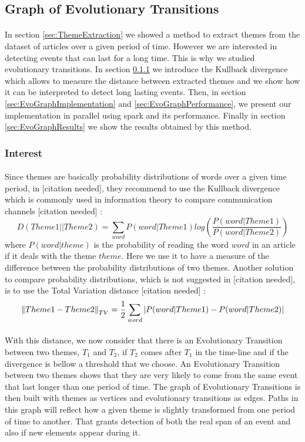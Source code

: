 \subsection{Graph of Evolutionary Transitions}
\paragraph{}
In section \ref{sec:ThemeExtraction} we showed a method to extract themes from the dataset of articles over a given period of time. However we are interested in detecting events that can last for a long time. This is why we studied evolutionary transitions. In section \ref{sec:EvoGraphInterest} we introduce the Kullback divergence which allows to measure the distance between extracted themes and we show how it can be interpreted to detect long lasting events. Then, in section \ref{sec:EvoGraphImplementation} and \ref{sec:EvoGraphPerformance}, we present our implementation in parallel using spark and its performance. Finally in section \ref{sec:EvoGraphResults} we show the results obtained by this method.

\subsubsection{Interest}
\label{sec:EvoGraphInterest}

\paragraph{}
Since themes are basically probability distributions of words over a given time period, in [citation needed], they recommend to use the Kullback divergence which is commonly used in information theory to compare communication channels [citation needed] :\[ D(Theme1 || Theme2) = \sum_{word} P(word|Theme1) log(\frac{P(word|Theme1)}{P(word|Theme2)})\]where $P(word|theme)$ is the probability of reading the word $word$ in an article if it deals with the theme $theme$. Here we use it to have a measure of the difference between the probability distributions of two themes. Another solution to compare probability distributions, which is not suggested in [citation needed], is to use the Total Variation distance [citation needed] :\[ \left\lVert Theme1 - Theme2\right\rVert_{TV} = \frac{1}{2} \sum_{word} |P(word|Theme1) - P(word|Theme2)|\]

\paragraph{}
With this distance, we now consider that there is an Evolutionary Transition between two themes, $T_1$ and $T_2$, if $T_2$ comes after $T_1$ in the time-line and if the divergence is bellow a threshold that we choose. An Evolutionary Transition between two themes shows that they are very likely to come from the same event that last longer than one period of time. The graph of Evolutionary Transitions is then built with themes as vertices and evolutionary transitions as edges. Paths in this graph will reflect how a given theme is slightly transformed from one period of time to another. That grants detection of both the real span of an event and also if new elements appear during it.

